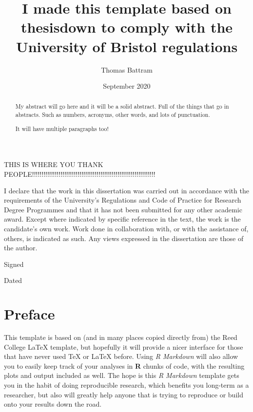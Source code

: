\documentclass[11pt,twoside]{bristolthesis}
\title{I made this template based on thesisdown to comply with the University of Bristol regulations}
\author{Thomas Battram}
\date{September 2020}
\begin{document}
  \maketitle

\frontmatter %
\pagestyle{empty} %
  \begin{abstract}
    My abstract will go here and it will be a solid abstract. Full of the things that go in abstracts. Such as numbers, acronyms, other words, and lots of punctuation.

    It will have multiple paragraphs too!
  \end{abstract}
  \begin{acknowledgements}
    THIS IS WHERE YOU THANK PEOPLE!!!!!!!!!!!!!!!!!!!!!!!!!!!!!!!!!!!!!!!!!!!!!!!!!!!!!!!!!!!!!!!!!
  \end{acknowledgements}
  \begin{declaration}
    I declare that the work in this dissertation was carried out in accordance with the requirements of the University's Regulations and Code of Practice for Research Degree Programmes and that it has not been submitted for any other academic award. Except where indicated by specific reference in the text, the work is the candidate's own work. Work done in collaboration with, or with the assistance of, others, is indicated as such. Any views expressed in the dissertation are those of the author.

    \bigskip
    \bigskip
    \bigskip
    \bigskip
    \bigskip

    Signed

    \bigskip
    \bigskip
    \bigskip
    \bigskip
    \bigskip

    Dated
  \end{declaration}
  \hypersetup{linkcolor=black}
  \setcounter{tocdepth}{3}
  \tableofcontents
  \listoftables
  \listoffigures

\mainmatter %
\pagestyle{plain}
\hypertarget{preface}{%
\chapter*{Preface}\label{preface}}

This template is based on (and in many places copied directly from) the Reed College LaTeX template, but hopefully it will provide a nicer interface for those that have never used TeX or LaTeX before. Using \emph{R Markdown} will also allow you to easily keep track of your analyses in \textbf{R} chunks of code, with the resulting plots and output included as well. The hope is this \emph{R Markdown} template gets you in the habit of doing reproducible research, which benefits you long-term as a researcher, but also will greatly help anyone that is trying to reproduce or build onto your results down the road.
\end{document}

